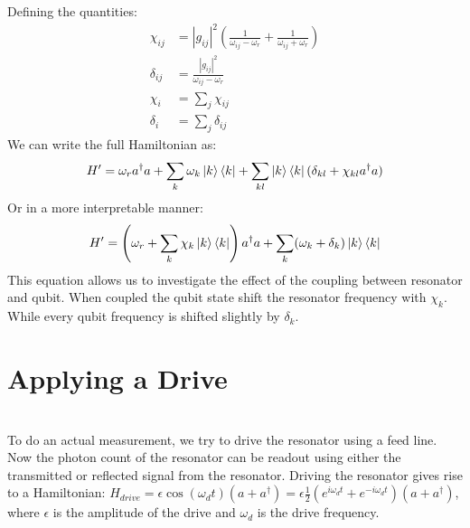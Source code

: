 Defining the quantities:
\begin{align}
    \chi_{ij} &= |g_{ij}|^2 \left(\frac{1}{\omega_{ij} - \omega_r} + \frac{1}{\omega_{ij} + \omega_r} \right) \\
    \delta_{ij} &= \frac{|g_{ij}|^2 }{\omega_{ij} - \omega_r} \\
    \chi_{i} &= \sum_j \chi_{ij} \\
    \delta_{i} &= \sum_j \delta_{ij} 
\end{align}
We can write the full Hamiltonian as:
\begin{equation}
    H' = \omega_r a^\dagger a + \sum_k \omega_k \ket{k}\bra{k} + \sum_{kl}\ket{k}\bra{k}(\delta_{kl} + \chi_{kl} a^\dagger a )
\end{equation}
Or in a more interpretable manner:
\begin{equation} \label{eq:multi_qubit_dispersive_hamiltonian}
    H' = \left(\omega_r + \sum_k \chi_k \ket{k}\bra{k} \right) a^\dagger a + \sum_k (\omega_k + \delta_k)\ket{k}\bra{k}
\end{equation}
This equation allows us to investigate the effect of the coupling between resonator and qubit. When coupled the qubit state shift the resonator frequency with $\chi_k$. While every qubit frequency is shifted slightly by $\delta_k$.



\section{Applying a Drive }
 \\
To do an actual measurement, we try to drive the resonator using a feed line. Now the photon count of the resonator can be readout using either the transmitted or reflected signal from the resonator. Driving the resonator gives rise to a Hamiltonian: $H_{drive} = \epsilon\cos(\omega_d t)(a + a^\dagger) = \epsilon\frac12 (e^{i\omega_d t} + e^{-i\omega_d t})(a + a^\dagger)$, where $\epsilon$ is the amplitude of the drive and $\omega_d$ is the drive frequency.

